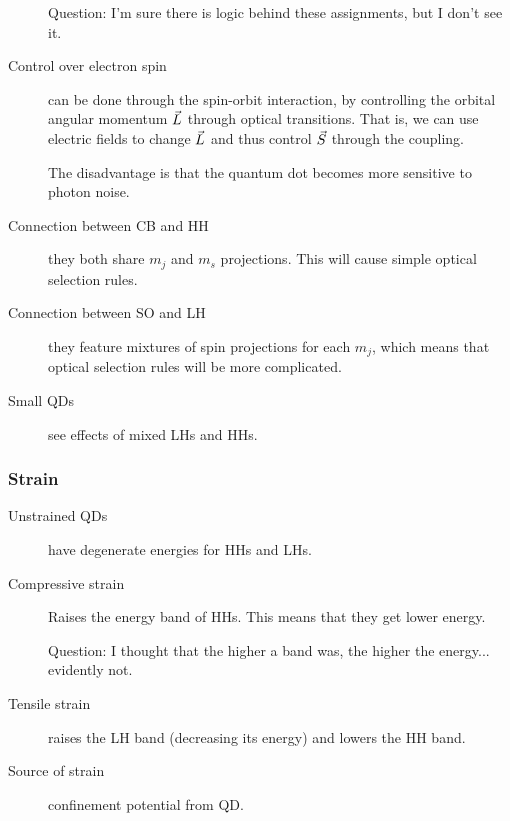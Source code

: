 \begin{description}
Question: I'm sure there is logic behind these assignments, but I don't see it. 

\item[Control over electron spin] can be done through the spin-orbit interaction, by controlling the orbital angular momentum $\vec{L}$ through optical transitions. That is, we can use electric fields to change $\vec{L}$ and thus control $\vec{S}$ through the coupling. 

The disadvantage is that the quantum dot becomes more sensitive to photon noise. 

\item[Connection between CB and HH] they both share $m_j$ and $m_s$ projections. This will cause simple optical selection rules. 

\item[Connection between SO and LH] they feature mixtures of spin projections for each $m_j$, which means that optical selection rules will be more complicated. 

\item[Small QDs] see effects of mixed LHs and HHs. 



\end{description}

\subsubsection{Strain}
\begin{description}
\item[Unstrained QDs] have degenerate energies for HHs and LHs. 

\item[Compressive strain] Raises the energy band of HHs. This means that they get lower energy. 

Question: I thought that the higher a band was, the higher the energy... evidently not. 

\item[Tensile strain] raises the LH band (decreasing its energy) and lowers the HH band. 

\item[Source of strain] confinement potential from QD. 

\end{description}

